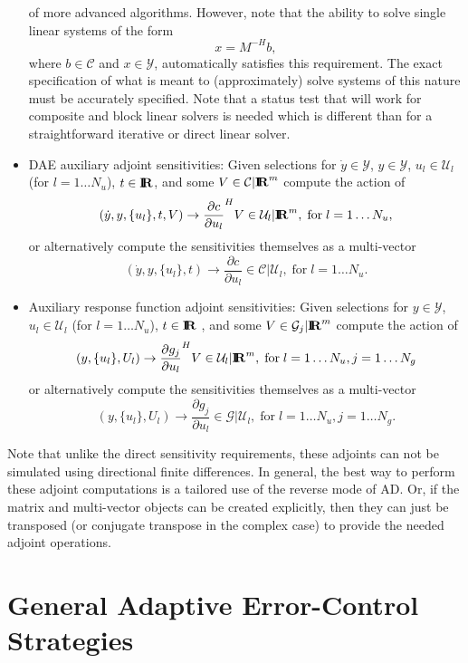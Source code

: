\documentclass[pdf,ps2pdf,11pt]{SANDreport}
\begin{document}
\begin{itemize}
of more advanced algorithms.  However, note that the ability to solve single
linear systems of the form
\[
x = M^{-H} b,
\]
where $b\in\mathcal{C}$ and $x\in\mathcal{Y}$, automatically satisfies this
requirement.  The exact specification of what is meant to (approximately)
solve systems of this nature must be accurately specified. Note that a status
test that will work for composite and block linear solvers is needed which is
different than for a straightforward iterative or direct linear solver.
%
{}\item DAE auxiliary adjoint sensitivities: Given selections for
$\dot{y}\in\mathcal{Y}$, $y\in\mathcal{Y}$, $u_l\in\mathcal{U}_l$ (for
$l=1\ldots{}N_u$), $t\in\mbox{\textbf{I}}\hspace{-0.6ex}\mbox{\textbf{R}}$, and some $V\in\mathcal{C}|\mbox{\textbf{I}}\hspace{-0.6ex}\mbox{\textbf{R}}^m$ compute
the action of
\[
(\dot{y},y,\{u_l\},t,V) {}\rightarrow \frac{\partial c}{\partial u_l}^H V \in \mathcal{U}_l|\mbox{\textbf{I}}\hspace{-0.6ex}\mbox{\textbf{R}}^m,
\; \mbox{for} \; l = 1 {}\ldots N_u,
\]
or alternatively compute the sensitivities themselves as a multi-vector
\[
(\dot{y},y,\{u_l\},t) {}\rightarrow \frac{\partial c}{\partial u_l} \in \mathcal{C}|\mathcal{U}_l,
\; \mbox{for} \; l = 1 {}\ldots N_u.
\]

{}\item Auxiliary response function adjoint sensitivities: Given selections for
$y\in\mathcal{Y}$, $u_l\in\mathcal{U}_l$ (for $l=1\ldots{}N_u$), $t\in\mbox{\textbf{I}}\hspace{-0.6ex}\mbox{\textbf{R}}$ ,
and some $V\in\mathcal{G}_j|\mbox{\textbf{I}}\hspace{-0.6ex}\mbox{\textbf{R}}^m$ compute the action of
\[
(y,\{u_l\},U_l) {}\rightarrow \frac{\partial g_j}{\partial u_l}^H V \in \mathcal{U}_l|\mbox{\textbf{I}}\hspace{-0.6ex}\mbox{\textbf{R}}^m,
\; \mbox{for} \; l = 1 {}\ldots N_u, j = 1 \ldots N_g
\]
or alternatively compute the sensitivities themselves as a multi-vector
\[
(y,\{u_l\},U_l) {}\rightarrow \frac{\partial g_j}{\partial u_l} \in \mathcal{G}|\mathcal{U}_l,
\; \mbox{for} \; l = 1 {}\ldots N_u, j = 1 \ldots N_g.
\]

\end{itemize}

Note that unlike the direct sensitivity requirements, these adjoints can not
be simulated using directional finite differences.  In general, the best way
to perform these adjoint computations is a tailored use of the reverse mode of
AD.  Or, if the matrix and multi-vector objects can be created explicitly,
then they can just be transposed (or conjugate transpose in the complex case)
to provide the needed adjoint operations.

\section{General Adaptive Error-Control Strategies}
\end{document}
